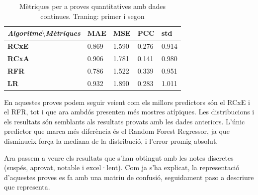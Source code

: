 \documentclass[12pt,a4paper,catalan]{article}
\begin{document}
\begin{table}[h]
\centering
\begin{tabular}{lllll}
\hline
\textit{\textbf{Algoritme$\setminus$Mètriques}} & \textbf{MAE} & \textbf{MSE} & \textbf{PCC} & \textbf{std} \\ \hline
\textbf{RCxE}          & 0.869          & 1.590          & 0.276          & 0.914          \\
\textbf{RCxA}          & 0.906          & 1.781          & 0.141          & 0.980          \\
\textbf{RFR}           & 0.786          & 1.522          & 0.339          & 0.951          \\
\textbf{LR}            & 0.932          & 1.890          & 0.283          & 1.011          \\ \hline
\end{tabular}
\caption{Mètriques per a proves quantitatives amb dades continues. Traning: primer i segon}
\end{table}

En aquestes proves podem seguir veient com els millors predictors són el RCxE i el RFR, tot i que ara ambdós presenten més mostres atípiques. Les distribucions i els resultats són semblants als resultats provats amb les dades anteriors. L'únic predictor que marca més diferència és el Random Forest Regressor, ja que disminueix força  la mediana de la distribució, i l'error promig absolut.

\newpage

Ara passem a veure els resultats que s'han obtingut amb les notes discretes (suspés, aprovat, notable i excel·lent). Com ja s'ha explicat, la representació d'aquestes proves es fa amb una matriu de confusió, seguidament paso a descriure que representa.
\end{document}

